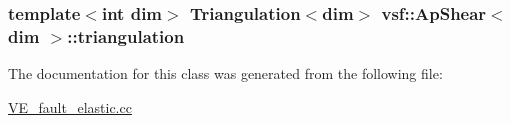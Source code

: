 \hypertarget{classvsf_1_1ApShear_a53d0e9d3fdabcac44cc7c6408ace451b}{
\subsubsection[{triangulation}]{\setlength{\rightskip}{0pt plus 5cm}template$<$int dim$>$ Triangulation$<$dim$>$ {\bf vsf\-::\-Ap\-Shear}$<$ dim $>$\-::triangulation\hspace{0.3cm}{\ttfamily [private]}}}\label{classvsf_1_1ApShear_a53d0e9d3fdabcac44cc7c6408ace451b}


The documentation for this class was generated from the following file\-:\begin{DoxyCompactItemize}
\item 
\hyperlink{VE__fault__elastic_8cc}{V\-E\-\_\-fault\-\_\-elastic.\-cc}\end{DoxyCompactItemize}
